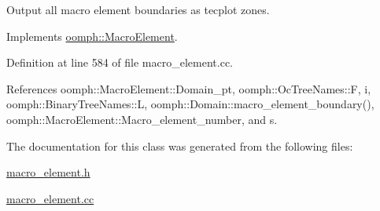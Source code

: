 Output all macro element boundaries as tecplot zones. 



Implements \hyperlink{classoomph_1_1MacroElement_a748b561313e952c9767d278d0e99be4e}{oomph\+::\+Macro\+Element}.



Definition at line 584 of file macro\+\_\+element.\+cc.



References oomph\+::\+Macro\+Element\+::\+Domain\+\_\+pt, oomph\+::\+Oc\+Tree\+Names\+::F, i, oomph\+::\+Binary\+Tree\+Names\+::L, oomph\+::\+Domain\+::macro\+\_\+element\+\_\+boundary(), oomph\+::\+Macro\+Element\+::\+Macro\+\_\+element\+\_\+number, and s.



The documentation for this class was generated from the following files\+:\begin{DoxyCompactItemize}
\item 
\hyperlink{macro__element_8h}{macro\+\_\+element.\+h}\item 
\hyperlink{macro__element_8cc}{macro\+\_\+element.\+cc}\end{DoxyCompactItemize}
